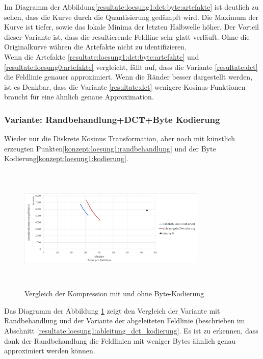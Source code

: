 Im Diagramm der Abbildung\ref{resultate:loesung1:dct:byte:artefakte} ist deutlich zu sehen, dass die Kurve durch die Quantisierung gedämpft wird. Die Maximum der Kurve ist tiefer, sowie das lokale Minima der letzten Halbwelle höher. Der Vorteil dieser Variante ist, dass die resultierende Feldline sehr glatt verläuft. Ohne die Originalkurve währen die Artefakte nicht zu identifizieren.\\
Wenn  die Artefakte \ref{resultate:loesung1:dct:byte:artefakte} und \ref{resultate:loesung0:artefakte} vergleicht, fällt auf, dass die Variante \ref{resultate:dct} die Feldlinie genauer approximiert. Wenn die Ränder besser dargestellt werden, ist es Denkbar, dass die Variante \ref{resultate:dct} wenigere Kosinus-Funktionen braucht für eine ähnlich genaue Approximation.

\subsubsection{Variante: Randbehandlung+DCT+Byte Kodierung} \label{resultate:loesung1:dct:randbeh+byte}
Wieder nur die Diskrete Kosinus Transformation, aber noch mit künstlich erzeugten Punkten\ref{konzept:loesung1:randbehandlung} und der Byte Kodierung\ref{konzept:loesung1:kodierung}.
\begin{figure}[!htbp]
	\center
	\includegraphics[width=0.8\textwidth,height=6cm,keepaspectratio]{./pictures/resultate/loesung1/loesung1-7/loesung1_7.png}
	\caption{Vergleich der Kompression mit und ohne Byte-Kodierung}
	\label{resultate:loesung1:dct:randbehandlung}
\end{figure}
Das Diagramm der Abbildung \ref{resultate:loesung1:dct:randbehandlung} zeigt den Vergleich der Variante mit Randbehandlung und der Variante der abgeleiteten Feldlinie (beschrieben im Abschnitt \ref{resultate:loesung1:ableitung_dct_kodierung}. Es ist zu erkennen, dass dank der Randbehandlung die Feldlinien mit weniger Bytes ähnlich genau approximiert werden können.\\
